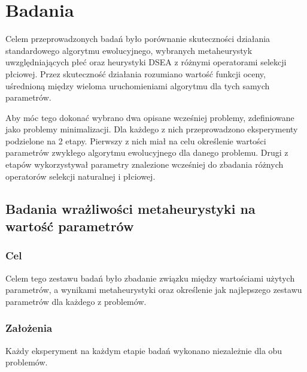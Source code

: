 \documentclass[./FM_mgr.tex]{subfiles}
\begin{document}
\section{Badania} \label{chapter:research}


Celem przeprowadzonych badań było porównanie skuteczności działania standardowego algorytmu ewolucyjnego, wybranych metaheurystyk uwzględniających płeć oraz heurystyki DSEA z różnymi operatorami selekcji płciowej.
Przez skuteczność działania rozumiano wartość funkcji oceny, uśrednioną między wieloma uruchomieniami algorytmu dla tych samych parametrów.

Aby móc tego dokonać wybrano dwa opisane wcześniej problemy, zdefiniowane jako problemy minimalizacji. 
Dla każdego z nich przeprowadzono eksperymenty podzielone na 2 etapy.
Pierwszy z nich miał na celu określenie wartości parametrów zwykłego algorytmu ewolucyjnego dla danego problemu.
Drugi z etapów wykorzystywał parametry znalezione wcześniej do zbadania różnych operatorów selekcji naturalnej i płciowej.

\subsection{Badania wrażliwości metaheurystyki na wartość parametrów}
\label{subsection:init_params}

\subsubsection*{Cel}
Celem tego zestawu badań było zbadanie związku między wartościami użytych parametrów, a wynikami metaheurystyki oraz określenie jak najlepszego zestawu parametrów dla każdego z problemów.

\subsubsection*{Założenia}
Każdy eksperyment na każdym etapie badań wykonano niezależnie dla obu problemów. 
\end{document}
